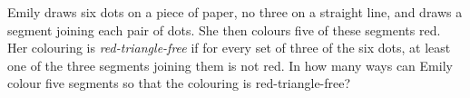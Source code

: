Emily draws six dots on a piece of paper, no three on a straight line, and draws a segment joining each pair of dots. She then colours five of these segments red. Her colouring is \emph{red-triangle-free} if for every set of three of the six dots, at least one of the three segments joining them is not red. In how many ways can Emily colour five segments so that the colouring is red-triangle-free?

